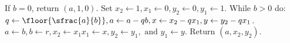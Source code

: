 \documentclass{subfiles}
\begin{document}
    \begin{algorithm}
        \caption{Extended Euclidean Algorithm}
        If \(b = 0\), return \((a, 1, 0)\).
        \DontPrintSemicolon\;
        Set \(x_{2} \leftarrow 1, x_{1} \leftarrow 0, y_{2} \leftarrow 0, y_{1} \leftarrow 1\).
        \DontPrintSemicolon\;
        While \(b > 0\) do:
            \DontPrintSemicolon\;
            \Indp\(
                    q \leftarrow \floor{\sfrac{a}{b}}, a \leftarrow a - qb,
                        x \leftarrow x_{2} - qx_{1}, y \leftarrow y_{2} - qx_{1}
                \).
            \DontPrintSemicolon\;
            \(
                    a \leftarrow b, b \leftarrow r, x_{2} \leftarrow x_{1} 
                        x_{1} \leftarrow x, y_{2} \leftarrow y_{1},
                        \text{ and } y_{1} \leftarrow y
                \).
            \DontPrintSemicolon\;
        \Indm Return \((a, x_{2}, y_{2})\).
    \end{algorithm}
\end{document}
